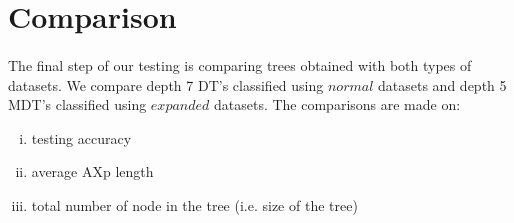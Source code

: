 \documentclass[12pt]{report}
\theoremstyle{definition}
\theoremstyle{definition}
\theoremstyle{definition}
\begin{document}
\section{Comparison}
\paragraph{} The final step of our testing is comparing trees obtained with both types of datasets. We compare depth 7 DT's classified using $normal$ datasets and depth 5 MDT's classified using $expanded$ datasets. The comparisons are made on:

\begin{enumerate}[(i)]
    \item testing accuracy
    \item average AXp length
    \item total number of node in the tree (i.e. size of the tree)
\end{enumerate} 
\end{document}
